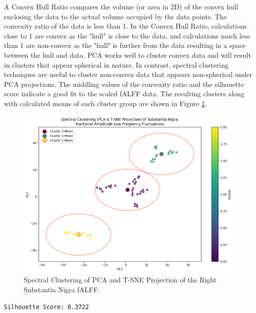 \documentclass[12pt]{article}
\begin{document}
A Convex Hull Ratio compares the volume (or area in 2D) of the convex hull enclosing the data to the actual volume occupied by the data points. The convexity ratio of the data is less than 1. In the Convex Hull Ratio, calculations close to 1 are convex as the "hull" is close to the data, and calculations much less than 1 are non-convex as the "hull" is further from the data resulting in a space between the hull and data. PCA works well to cluster convex data and will result in clusters that appear spherical in nature. In contrast, spectral clustering techniques are useful to cluster non-convex data that appears non-spherical under PCA projections. The middling values of the convexity ratio and the silhouette score indicate a good fit to the scaled fALFF data. The resulting clusters along with calculated means of each cluster group are shown in Figure \ref{fig:clustering}.

\FloatBarrier

\begin{figure}[h]  %
    \centering
    \includegraphics[width=\textwidth]{"../img/fALFF_SN_Spectral_Clustering.png"}  %
    \caption{Spectral Clustering of PCA and T-SNE Projection of the Right Substantia Nigra fALFF.}
    \label{fig:clustering}  %
\end{figure}

\begin{center}
    \texttt{Silhouette Score: 0.3722}
\end{center}
\end{document}
